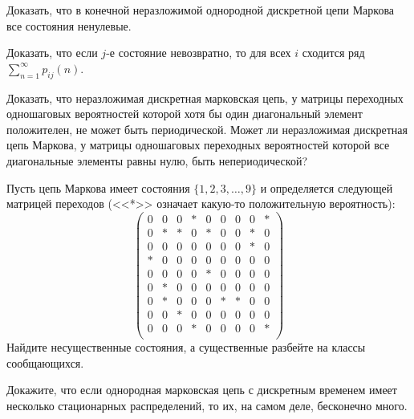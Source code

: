 \documentclass[12pt]{article}
\def\canon{\textbf{(каноническое задание)}}
\begin{document}
\begin{exercise}[subtitle={\canon}]
    Доказать, что в конечной неразложимой однородной дискретной цепи Маркова все состояния ненулевые.
\end{exercise}


\begin{exercise}[subtitle={\canon}]
    Доказать, что если $ j $-е состояние невозвратно, то для всех $ i $ сходится ряд $ \sum_{n=1}^\infty p_{ij}(n) $.
\end{exercise}


\begin{exercise}[subtitle={\canon}]
    Доказать, что неразложимая дискретная марковская цепь,
    у матрицы переходных одношаговых вероятностей которой хотя бы один диагональный элемент положителен,
    не может быть периодической.
    Может ли неразложимая дискретная цепь Маркова,
    у матрицы одношаговых переходных вероятностей которой все диагональные элементы равны нулю,
    быть непериодической?
\end{exercise}


\begin{exercise}
    Пусть цепь Маркова имеет состояния $ \{1, 2, 3, \ldots, 9\} $
    и определяется следующей матрицей переходов
    (<<*>> означает какую-то положительную вероятность):
    \[
        \begin{pmatrix}
            0 & 0 & 0 & * & 0 & 0 & 0 & 0 & * \\
            0 & * & * & 0 & * & 0 & 0 & * & 0 \\
            0 & 0 & 0 & 0 & 0 & 0 & 0 & * & 0 \\
            * & 0 & 0 & 0 & 0 & 0 & 0 & 0 & 0 \\
            0 & 0 & 0 & 0 & * & 0 & 0 & 0 & 0 \\
            0 & * & 0 & 0 & 0 & 0 & 0 & 0 & 0 \\
            0 & * & 0 & 0 & 0 & * & * & 0 & 0 \\
            0 & 0 & * & 0 & 0 & 0 & 0 & 0 & 0 \\
            0 & 0 & 0 & * & 0 & 0 & 0 & 0 & * \\
        \end{pmatrix}
    \]
    Найдите несущественные состояния,
    а существенные разбейте на классы сообщающихся.
\end{exercise}


\begin{exercise}
    Докажите, что если однородная марковская цепь с дискретным временем имеет несколько стационарных распределений,
    то их, на самом деле, бесконечно много.
\end{exercise}
\end{document}
